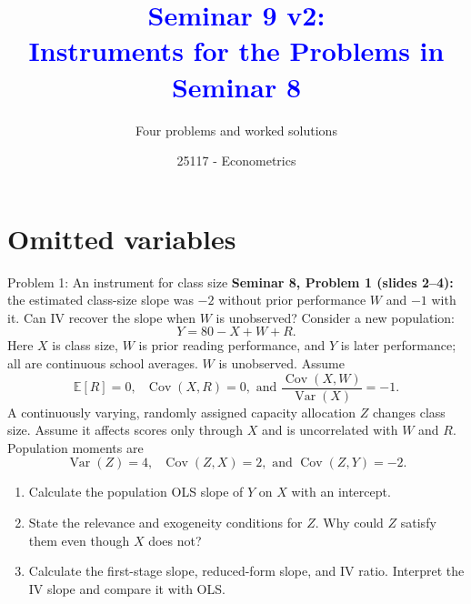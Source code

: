 \documentclass[notes,10pt, aspectratio=169]{beamer}
\title[]{\textcolor{blue}{Seminar 9 v2:\\Instruments for the Problems in Seminar 8}}
\subtitle{Four problems and worked solutions}
\author{25117 - Econometrics}
\institute[shortinst]{Universitat Pompeu Fabra}
\date{}
\newcommand{\E}{\mathbb{E}}
\newcommand{\Var}{\operatorname{Var}}
\newcommand{\Cov}{\operatorname{Cov}}
\begin{document}
\begin{frame}[plain]
\maketitle
\end{frame}

\section{Omitted variables}
\begin{frame}{Problem 1: An instrument for class size}
\small
\setlength{\abovedisplayskip}{4pt}
\setlength{\belowdisplayskip}{4pt}
\textbf{Seminar 8, Problem 1 (slides 2--4):} the estimated class-size slope was $-2$ without prior performance $W$ and $-1$ with it. Can IV recover the slope when $W$ is unobserved? Consider a new population:
\[
Y=80-X+W+R.
\]
Here $X$ is class size, $W$ is prior reading performance, and $Y$ is later performance; all are continuous school averages. $W$ is unobserved. Assume
\[
\E[R]=0,\text{ }\Cov(X,R)=0,\text{ and }\frac{\Cov(X,W)}{\Var(X)}=-1.
\]
A continuously varying, randomly assigned capacity allocation $Z$ changes class size. Assume it affects scores only through $X$ and is uncorrelated with $W$ and $R$. Population moments are
\[
\Var(Z)=4,\text{ }\Cov(Z,X)=2,\text{ and }\Cov(Z,Y)=-2.
\]
\begin{enumerate}
\item Calculate the population OLS slope of $Y$ on $X$ with an intercept.
\item State the relevance and exogeneity conditions for $Z$. Why could $Z$ satisfy them even though $X$ does not?
\item Calculate the first-stage slope, reduced-form slope, and IV ratio. Interpret the IV slope and compare it with OLS.
\end{enumerate}
\end{frame}
\end{document}
